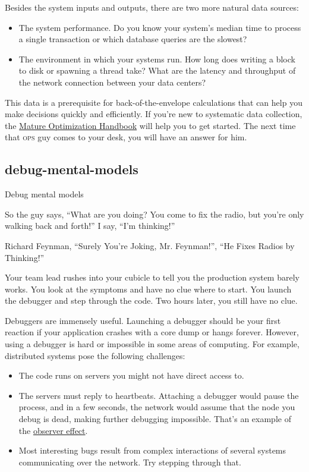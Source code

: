 \documentclass{article}
\begin{document}
Besides the system inputs and outputs, there are two more natural data sources:
\begin{itemize}
\item The system performance.
Do you know your system's median time to process a single transaction or which database queries are the slowest?
\item The environment in which your systems run.
How long does writing a block to disk or spawning a thread take?
What are the latency and throughput of the network connection between your data centers?
\end{itemize}

This data is a prerequisite for back-of-the-envelope calculations that can help you make decisions quickly and efficiently.
If you're new to systematic data collection,
the \href{https://carlos.bueno.org/optimization/}{Mature Optimization Handbook} will help you to get started.
The next time that \textsc{ops} guy comes to your desk,
you will have an answer for him.

\subsection{debug-mental-models}{Debug mental models}

\epigraph{
    So the guy says, ``What are you doing? You come to fix the radio, but you're only walking back and forth!''
    I say, ``I'm thinking!''
}{Richard Feynman, ``Surely You're Joking, Mr. Feynman!'', ``He Fixes Radios by Thinking!''}

Your team lead rushes into your cubicle to tell you the production system barely works.
You look at the symptoms and have no clue where to start.
You launch the debugger and step through the code.
Two hours later, you still have no clue.

Debuggers are immensely useful.
Launching a debugger should be your first reaction if your application crashes with a core dump or hangs forever.
However, using a debugger is hard or impossible in some areas of computing.
For example, distributed systems pose the following challenges:
\begin{itemize}
\item The code runs on servers you might not have direct access to.
\item The servers must reply to heartbeats.
Attaching a debugger would pause the process, and in a few seconds, the network would assume that the node you debug is dead, making further debugging impossible.
That's an example of the \href{https://en.wikipedia.org/wiki/Observer_effect_(physics)}{observer effect}.
\item
Most interesting bugs result from complex interactions of several systems communicating over the network.
Try stepping through that.
\end{itemize}
\end{document}
